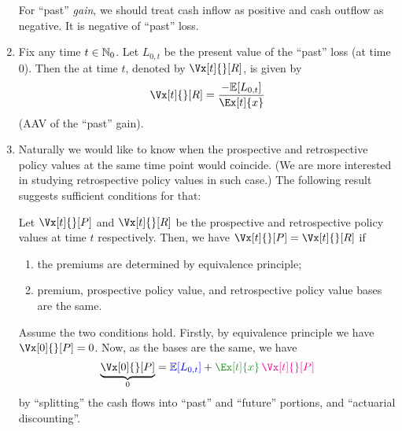 \begin{enumerate}

For ``past'' \emph{gain}, we should treat cash inflow as positive and cash
outflow as negative. It is negative of ``past'' loss.

\item Fix any time \(t\in\mathbb{N}_0\). Let \(L_{0,t}\) be the present value of the
``past'' loss (at time 0). Then the  at time
\(t\), denoted by
\(\Vx[t]{}[R]\), is given by
\[
\Vx[t]{}[R]=\frac{-\expv{L_{0,t}}}{\Ex[t]{x}}
\]
(AAV of the ``past'' gain).

\item Naturally we would like to know when the prospective and retrospective
policy values at the same time point would coincide. (We are more interested in
studying retrospective policy values in such case.) The following result
suggests sufficient conditions for that:
\begin{proposition}
\label{prp:pro-retro-pv-equal}
Let \(\Vx[t]{}[P]\) and \(\Vx[t]{}[R]\) be the prospective and retrospective
policy values at time \(t\) respectively. Then, we have
\(\Vx[t]{}[P]=\Vx[t]{}[R]\) if
\begin{enumerate}
\item the premiums are determined by equivalence principle;

\item premium, prospective policy value, and retrospective policy value bases are the same.
\end{enumerate}
\end{proposition}
\begin{pf}
Assume the two conditions hold. Firstly, by equivalence principle we have
\(\Vx[0]{}[P]=0\). Now, as the bases are the same, we have
\[
\underbrace{\Vx[0]{}[P]}_{0}={\color{blue}\expv{L_{0,t}}}
+{\color{ForestGreen}\Ex[t]{x}}\,{\color{magenta}\Vx[t]{}[P]}
\]
by ``splitting'' the cash flows into ``past'' and ``future'' portions, and
``actuarial discounting''.


\end{pf}
\end{enumerate}
